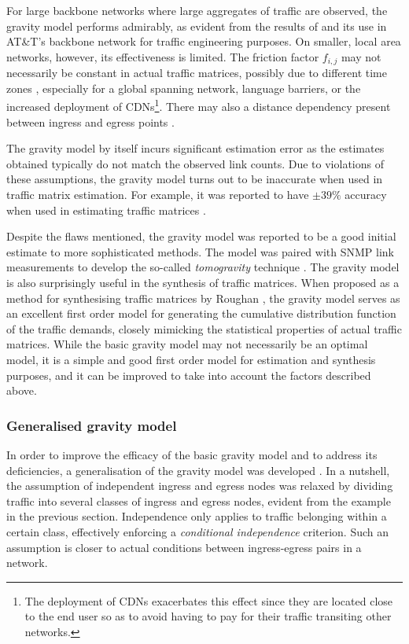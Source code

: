 For large backbone networks where large aggregates of traffic are
observed, the gravity model performs admirably, as evident
from the results of \cite{Zhang03Fast} and its use in AT\&T's backbone
network for traffic engineering purposes. On smaller, local area networks, however,
its effectiveness is limited. The friction factor $f_{i,j}$ may not necessarily be
constant in actual traffic matrices, possibly due to different time
zones \cite{Roughan10Robust}, especially for a global spanning
network, language barriers, or the increased deployment of CDNs\footnote{The
deployment of CDNs exacerbates this effect since they are located close to
the end user so as to avoid having to pay for their traffic transiting 
other networks.}. There may also a distance dependency present 
between ingress and egress points \cite{Alderson06Topology}.

The gravity model by itself incurs significant estimation error as the
estimates obtained typically do not match the observed link
counts. Due to violations of these assumptions, the gravity model
turns out to be inaccurate when used in traffic matrix estimation. For
example, it was reported to have $\pm 39\%$ accuracy when used in
estimating traffic matrices \cite{Roughan05GravSynth}.

Despite the flaws mentioned, the gravity model was reported to be a
good initial estimate to more sophisticated methods.  The model was
paired with SNMP link measurements to develop the so-called
\emph{tomogravity} technique \cite{Zhang03Fast}. The gravity model is
also surprisingly useful in the synthesis of traffic matrices. When
proposed as a method for synthesising traffic matrices by Roughan
\cite{Roughan05GravSynth}, the gravity model serves as an excellent
first order model for generating the cumulative distribution function
of the traffic demands, closely mimicking the statistical properties
of actual traffic matrices. While the basic gravity model may not
necessarily be an optimal model, it is a simple and good first order
model for estimation and synthesis purposes, and it can be improved to
take into account the factors described above.

\subsubsection{Generalised gravity model}

In order to improve the efficacy of the basic gravity model and to
address its deficiencies, a generalisation of the gravity model was
developed \cite{Zhang03InfoSIGCOMM,Zhang05InfoTh}. In a nutshell, the
assumption of independent ingress and egress nodes was relaxed by
dividing traffic into several classes of ingress and egress nodes,
evident from the example in the previous section.  Independence only
applies to traffic belonging within a certain class, effectively
enforcing a \emph{conditional independence} criterion. Such an
assumption is closer to actual conditions between ingress-egress pairs
in a network.

